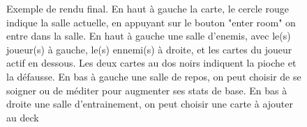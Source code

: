 \begin{figure}[H]
\begin{center}
%
\qquad
{}%
\qquad
{}%
\qquad
{}%
\caption{\label{slaythespiregame}Exemple de rendu final. En haut à gauche la carte, le cercle rouge indique la salle actuelle, en appuyant sur le bouton "enter room" on entre dans la salle. En haut à gauche une salle d'enemis, avec le(s) joueur(s) à gauche, le(s) ennemi(s) à droite, et les cartes du joueur actif en dessous. Les deux cartes au dos noirs indiquent la pioche et la défausse. En bas à gauche une salle de repos, on peut choisir de se soigner ou de méditer pour augmenter ses stats de base. En bas à droite une salle d'entrainement, on peut choisir une carte à ajouter au deck}
\end{center}
\end{figure}

